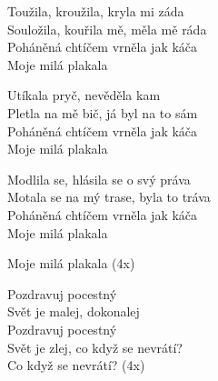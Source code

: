 
\ve{}
Toužila, kroužila, kryla mi záda\\
Souložila, kouřila mě, měla mě ráda\\
Poháněná chtíčem vrněla jak káča\\
Moje milá plakala

\ve{}
Utíkala pryč, nevěděla kam\\
Pletla na mě bič, já byl na to sám\\
Poháněná chtíčem vrněla jak káča\\
Moje milá plakala

\ve{}
Modlila se, hlásila se o svý práva\\
Motala se na mý trase, byla to tráva\\
Poháněná chtíčem vrněla jak káča\\
Moje milá plakala

Moje milá plakala (4x)

\cho{}
Pozdravuj pocestný\\
Svět je malej, dokonalej\\
Pozdravuj pocestný\\
Svět je zlej, co když se nevrátí?\\
Co když se nevrátí? (4x)

\cho{}

\esong{}